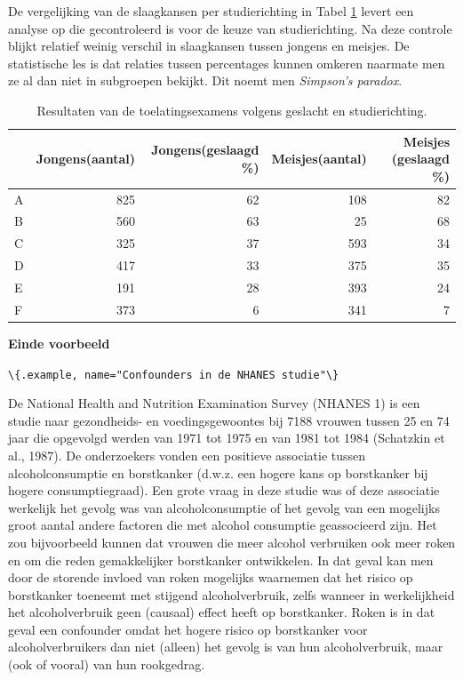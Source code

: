 \documentclass[
  12pt,dutch,coursenotes]{book}
\newcommand{\passthrough}[1]{#1}
\begin{document}
De vergelijking van de slaagkansen per studierichting in Tabel \ref{tab:sexbias}
levert een analyse op die gecontroleerd is voor de keuze van
studierichting. Na deze controle blijkt relatief weinig verschil in
slaagkansen tussen jongens en meisjes. De statistische les is dat relaties
tussen percentages kunnen omkeren naarmate men ze al dan niet in subgroepen
bekijkt. Dit noemt men \emph{Simpson's paradox}.

\begin{table}

\caption{\label{tab:sexbias}Resultaten van de toelatingsexamens volgens geslacht en studierichting.}
\centering
\begin{tabular}[t]{lrrrr}
\toprule
  & Jongens(aantal) & Jongens(geslaagd \%) & Meisjes(aantal) & Meisjes (geslaagd \%)\\
\midrule
A & 825 & 62 & 108 & 82\\
B & 560 & 63 & 25 & 68\\
C & 325 & 37 & 593 & 34\\
D & 417 & 33 & 375 & 35\\
E & 191 & 28 & 393 & 24\\
\addlinespace
F & 373 & 6 & 341 & 7\\
\bottomrule
\end{tabular}
\end{table}

\textbf{Einde voorbeeld}

\passthrough{\lstinline!\{.example, name="Confounders in de NHANES studie"\}!}

De National Health and Nutrition Examination Survey
(NHANES 1) is een studie naar gezondheids- en voedingsgewoontes bij 7188
vrouwen tussen 25 en 74 jaar die opgevolgd werden van 1971 tot 1975 en van
1981 tot 1984 (Schatzkin et al., 1987). De onderzoekers vonden een positieve
associatie tussen alcoholconsumptie en borstkanker (d.w.z. een hogere kans
op borstkanker bij hogere consumptiegraad). Een grote vraag in deze studie
was of deze associatie werkelijk het gevolg was van alcoholconsumptie of het
gevolg van een mogelijks groot aantal andere factoren die met alcohol
consumptie geassocieerd zijn. Het zou bijvoorbeeld kunnen dat vrouwen die
meer alcohol verbruiken ook meer roken en om die reden gemakkelijker
borstkanker ontwikkelen. In dat geval kan men door de storende invloed van
roken mogelijks waarnemen dat het risico op borstkanker toeneemt met
stijgend alcoholverbruik, zelfs wanneer in werkelijkheid het alcoholverbruik
geen (causaal) effect heeft op borstkanker. Roken is in dat geval een
confounder omdat het hogere risico op borstkanker voor alcoholverbruikers
dan niet (alleen) het gevolg is van hun alcoholverbruik, maar (ook of
vooral) van hun rookgedrag.
\end{document}
